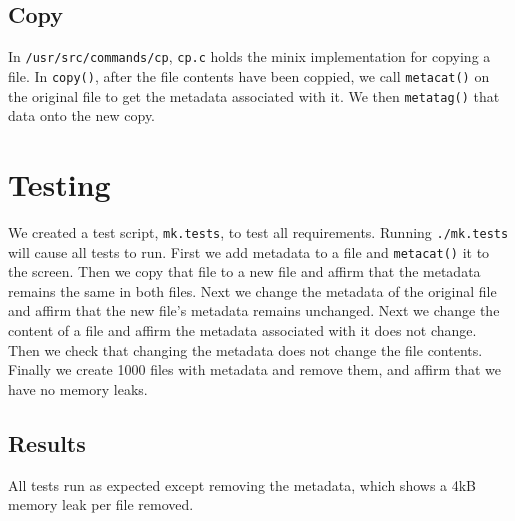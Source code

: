 \documentclass[10pt]{article}
\begin{document}
\subsection*{Copy}
In {\tt /usr/src/commands/cp}, {\tt cp.c} holds the minix implementation for copying a file.  In {\tt copy()}, after the file contents have been coppied, we call {\tt metacat()} on the original file to get the metadata associated with it.  We then {\tt metatag()} that data onto the new copy.

\section*{Testing}

We created a test script, {\tt mk.tests}, to test all requirements.  Running {\tt ./mk.tests} will cause all tests to run.  First we  add metadata to a file and {\tt metacat()} it to the screen. Then we copy that file to a new file and affirm that the metadata remains the same in both files.  Next we change the metadata of the original file and affirm that the new file's metadata remains unchanged.  Next we change the content of a file and affirm the metadata associated with it does not change.  Then we check that changing the metadata does not change the file contents.  Finally we create 1000 files with metadata and remove them, and affirm that we have no memory leaks.

\subsection*{Results}
All tests run as expected except removing the metadata, which shows a 4kB memory leak per file removed.
\end{document}
